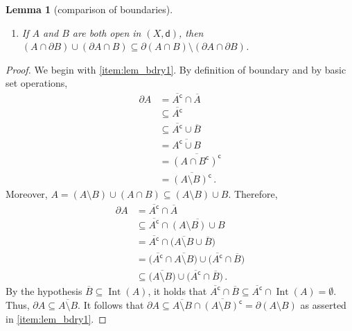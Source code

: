 \documentclass[pdflatex,sn-mathphys-num]{sn-jnl-preprint}
\DeclareMathOperator{\Int}{Int} %
\newcommand{\comp}{\textsf{c}} %
\theoremstyle{thmstyleone}%
\newtheorem{lemma}[theorem]{Lemma}%
\theoremstyle{thmstyletwo}%
\theoremstyle{thmstylethree}%
\numberwithin{equation}{section}
\numberwithin{theorem}{section}
\begin{document}
\begin{appendices}
\begin{lemma}[comparison of boundaries]
\begin{enumerate}[label=(\roman*)]
		\item If $A$ and $B$ are both open in $(X, \mathsf{d})$, then $(A\cap\partial B)\cup (\partial A\cap B)\subseteq \partial(A\cap B)\setminus (\partial A\cap\partial B)$.\label{item:lem_bdry2}
	\end{enumerate}
\end{lemma}
\begin{proof}
	We begin with \cref{item:lem_bdry1}. By definition of boundary and by basic set operations,
	\begin{align*}
		\partial A &=\overline{A^\comp}\cap \overline{A}\\
		&\subseteq \overline{A^\comp}\\
		&\subseteq \overline{A^\comp}\cup\overline{B}\\
		&=\overline{A^\comp\cup B}\\
		&=\overline{(A\cap B^\comp)^\comp}\\
		&=\overline{(A\setminus B)^\comp}\,.
	\end{align*}
	Moreover, $A=(A\setminus B)\cup (A\cap B)\subseteq (A\setminus B)\cup B$. Therefore,
	\begin{align*}
		\partial A &=\overline{A^\comp}\cap \overline{A}\\
		&\subseteq \overline{A^\comp}\cap \overline{(A\setminus B)\cup B}\\
		& = \overline{A^\comp}\cap\bigl(\overline{A\setminus B} \cup \overline{B}\bigr)\\
		&= \bigl(\overline{A^\comp}\cap \overline{A\setminus B}\bigr) \cup \bigl(\overline{A^\comp}\cap\overline{B}\bigr)\\
		&\subseteq \bigl(\overline{A\setminus B}\bigr) \cup \bigl(\overline{A^\comp}\cap\overline{B}\bigr)\,.
	\end{align*}
	By the hypothesis $\overline{B}\subseteq \Int(A)$, it holds that $\overline{A^\comp}\cap\overline{B}\subseteq \overline{A^\comp}\cap \Int(A) = \emptyset$. Thus, $\partial A\subseteq \overline{A\setminus B}$. It follows that $\partial A\subseteq \overline{A\setminus B} \cap \overline{(A\setminus B)^\comp}=\partial(A\setminus B)$ as asserted in \cref{item:lem_bdry1}.
	

\end{proof}
\end{appendices}
\end{document}
